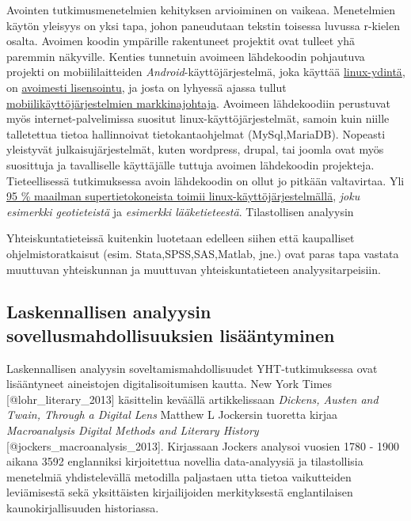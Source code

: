 Avointen tutkimusmenetelmien kehityksen arvioiminen on vaikeaa.
Menetelmien käytön yleisyys on yksi tapa, johon paneudutaan tekstin
toisessa luvussa r-kielen osalta. Avoimen koodin ympärille rakentuneet
projektit ovat tulleet yhä paremmin näkyville. Kenties tunnetuin
avoimeen lähdekoodin pohjautuva projekti on mobiililaitteiden
\emph{Android}-käyttöjärjestelmä, joka käyttää
\href{http://en.wikipedia.org/wiki/Android_\%28operating_system\%29\#Linux}{linux-ydintä},
on
\href{http://en.wikipedia.org/wiki/Android_\%28operating_system\%29\#Licensing}{avoimesti
lisensointu}, ja josta on lyhyessä ajassa tullut
\href{http://en.wikipedia.org/wiki/Android_\%28operating_system\%29\#Market_share_and_rate_of_adoption}{mobiilikäyttöjärjestelmien
markkinajohtaja}. Avoimeen lähdekoodiin perustuvat myös
internet-palvelimissa suositut linux-käyttöjärjestelmät, samoin kuin
niille talletettua tietoa hallinnoivat tietokantaohjelmat
(MySql,MariaDB). Nopeasti yleistyvät julkaisujärjestelmät, kuten
wordpress, drupal, tai joomla ovat myös suosittuja ja tavalliselle
käyttäjälle tuttuja avoimen lähdekoodin projekteja. Tieteellisessä
tutkimuksessa avoin lähdekoodin on ollut jo pitkään valtavirtaa. Yli
\href{http://en.wikipedia.org/wiki/Usage_share_of_operating_systems\#Supercomputers}{95
\% maailman supertietokoneista toimii linux-käyttöjärjestelmällä},
\emph{joku esimerkki geotieteistä} ja \emph{esimerkki lääketieteestä}.
Tilastollisen analyysin

Yhteiskuntatieteissä kuitenkin luotetaan edelleen siihen että
kaupalliset ohjelmistoratkaisut (esim. Stata,SPSS,SAS,Matlab, jne.) ovat
paras tapa vastata muuttuvan yhteiskunnan ja muuttuvan
yhteiskuntatieteen analyysitarpeisiin.

\subsection{Laskennallisen analyysin sovellusmahdollisuuksien
lisääntyminen}\label{laskennallisen-analyysin-sovellusmahdollisuuksien-lisuxe4uxe4ntyminen}

Laskennallisen analyysin soveltamismahdollisuudet YHT-tutkimuksessa ovat
lisääntyneet aineistojen digitalisoitumisen kautta. New York Times
{[}@lohr\_literary\_2013{]} käsittelin keväällä artikkelissaan
\emph{Dickens, Austen and Twain, Through a Digital Lens} Matthew L
Jockersin tuoretta kirjaa \emph{Macroanalysis Digital Methods and
Literary History} {[}@jockers\_macroanalysis\_2013{]}. Kirjassaan
Jockers analysoi vuosien 1780 - 1900 aikana 3592 englanniksi
kirjoitettua novellia data-analyysiä ja tilastollisia menetelmiä
yhdistelevällä metodilla paljastaen utta tietoa vaikutteiden
leviämisestä sekä yksittäisten kirjailijoiden merkityksestä
englantilaisen kaunokirjallisuuden historiassa.

